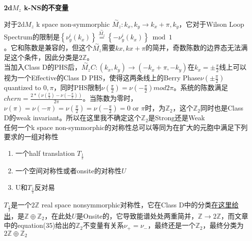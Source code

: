 
\usepackage[UTF8]{ctex,hyperref}


\begin{Large}
    \textsf{\textbf{2d$ M_z $  k-NS的不变量}}

\end{Large}

对于2d$ M_z $  k space non-symmorphic $ \overset{\sim}{M_z}:k_x,k_y\to k_x+\pi,k_y $，它对于Wilson Loop Spectrum的限制是$ \left\{\nu_y^i\left(k_x\right)\right\} \stackrel{\overset{\sim}{M_z}}{=}\left\{-\nu_y^i\left(k_x\right)\right\} \bmod 1 $ \\。它和陈数是兼容的，但这个$ \overset{\sim}{M_z} $需要$ kx,kx+\pi $的简并，奇数陈数的边界态无法满足这个条件，因此分类是$ 2\mathbb{Z} $。\\
当加入Class D的PHS后，$ \overset{\sim}{M_z}C:(k_x,k_y)\to(-k_x+\pi,-k_y) $在$ k_x=\pm\frac{\pi}{2} $线上可以视为一个Effective的Class D PHS，使得这两条线上的Berry Phase$ \nu(\pm\frac{\pi}{2}) $  quantized to $ 0,\pi $，同时PHS限制$ \nu(\frac{\pi}{2}) = \nu(-\frac{\pi}{2}) mod 2\pi$。系统的陈数满足$ chern =  \frac{2*(\nu(\frac{\pi}{2})-\nu(-\frac{\pi}{2}))}{2\pi}$。当陈数为零时，$ \nu(\pi) = \nu(-\pi) = \nu(\frac{\pi}{2}) = \nu(-\frac{\pi}{2}) = 0 \text{ or } \pi$时，为$ \mathbb{Z}_2 $，这个$ \mathbb{Z}_2 $同时也是Class D的weak invariant。所以在这里我不确定这个$ \mathbb{Z}_2 $是Strong还是Weak \\          
任何一个k space non-symmorphic的对称性总可以等同为在扩大的元胞中满足下列要求的一组对称性
\begin{enumerate}
    \item 一个half translation $ T_{\frac{1}{2}} $ 
    \item 一个空间对称性或者onsite的对称性$ U $
    \item U和$ T_{\frac{1}{2}} $反对易
\end{enumerate}
$ T_{\frac{1}{2}} $是一个$ 2\mathbb{Z} $ real space nonsymmorphic对称性，它在Class D中的分类\href{https://journals.aps.org/prb/pdf/10.1103/PhysRevB.93.195413#page=19.70}{在这里给出}，是$ \mathbb{Z}\oplus\mathbb{Z}_2 $，在此处$ U $是Onsite的，它导致能谱处处两重简并，$ \mathbb{Z}\to2\mathbb{Z} $，而文章中的equation(35)给出的$ \mathbb{Z}_2 $不变量有关系$ \nu_+ = \nu_- $，最终还是一个$ \mathbb{Z}_2 $，最终分类为$ 2\mathbb{Z}\oplus\mathbb{Z}_2 $     
